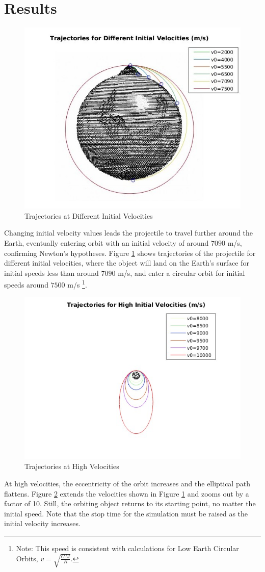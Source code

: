 \documentclass[aps,twocolumn]{revtex4-1}
\begin{document}
\section{Results}
\begin{figure}
    \centering
    \includegraphics[width=.5\textwidth]{diffTrajec.jpg}
    \caption{Trajectories at Different Initial Velocities}
    \label{diffTrajec}
\end{figure}
Changing initial velocity values leads the projectile to travel further around the Earth, eventually entering orbit with an initial velocity of around $7090$ m/s, confirming Newton's hypotheses. Figure \ref{diffTrajec} shows trajectories of the projectile for different initial velocities, where the object will land on the Earth's surface for initial speeds less than around $7090$ m/s, and enter a circular orbit for initial speeds around $7500$ m/s \footnote{Note: This speed is consistent with calculations for Low Earth Circular Orbits, $v=\sqrt{\frac{GM}{R}}$.}. 
\begin{figure}
    \centering
    \includegraphics[width=.5\textwidth]{highVelo.jpg}
    \caption{Trajectories at High Velocities}
    \label{highVelo}
\end{figure}

At high velocities, the eccentricity of the orbit increases and the elliptical path flattens. Figure \ref{highVelo} extends the velocities shown in Figure \ref{diffTrajec} and zooms out by a factor of 10. Still, the orbiting object returns to its starting point, no matter the initial speed. Note that the stop time for the simulation must be raised as the initial velocity increases.
\end{document}
